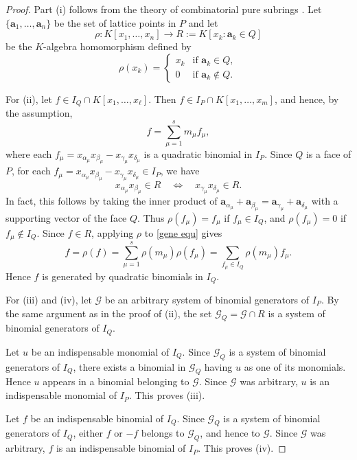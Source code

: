 \documentclass[12pt]{amsart}
\theoremstyle{definition}
\numberwithin{thm}{section}
\numberwithin{equation}{section}
\def\ab{{\mathbf a}}
\begin{document}
\begin{proof}
    Part (i) follows from the theory of combinatorial pure subrings \cite[Theorem 1.3]{cpureR1}.
Let $\{\ab_1,\dots, \ab_n\}$ be the set of lattice points in $P$
and let
\[
\rho:K[x_1,\ldots,x_n]\longrightarrow R:=K[x_k : \ab_k\in Q]
\]
be the \(K\)-algebra homomorphism defined by
\[
\rho(x_k)=
\begin{cases}
x_k & \text{if } \ab_k\in Q,\\
0 & \text{if } \ab_k\notin Q.
\end{cases}
\]


    
For (ii), let \(f\in I_Q\cap K[x_1,\ldots,x_\ell]\). 
Then
\(f\in I_P\cap K[x_1,\ldots,x_m]\), and hence, by the assumption,
\begin{equation} \label{gene equ}
    f=\sum_{\mu=1}^s m_\mu f_\mu,
\end{equation}
where each \(f_\mu=x_{\alpha_\mu} x_{\beta_\mu} - x_{\gamma_\mu} x_{\delta_\mu} \)
is a quadratic binomial in \(I_P\).
Since \(Q\) is a face of \(P\), for each  \(f_\mu=x_{\alpha_\mu} x_{\beta_\mu} - x_{\gamma_\mu} x_{\delta_\mu}\in I_P\),
we have
\[
x_{\alpha_\mu} x_{\beta_\mu}\in R \quad \Longleftrightarrow \quad   x_{\gamma_\mu} x_{\delta_\mu}\in R.
\]
In fact, this follows by taking the inner product of $\ab_{\alpha_\mu} +\ab_{\beta_\mu} =\ab_{\gamma_\mu} +\ab_{\delta_\mu}$ with a supporting vector of the face \(Q\).
Thus \(\rho(f_\mu)=f_\mu\) if \(f_\mu\in I_Q\), and  \(\rho(f_\mu)=0\)
if \(f_\mu\notin I_Q\).
Since \(f\in R\), applying \(\rho\) to  \eqref{gene equ} gives
\[
f=\rho(f)
=\sum_{\mu=1}^s \rho(m_\mu)\rho(f_\mu)
=\sum_{f_\mu \in I_Q} \rho(m_\mu) f_\mu.
\]
Hence \(f\) is generated by quadratic binomials in \(I_Q\).

For (iii) and (iv), let $\mathcal{G}$ be an arbitrary system of binomial generators of $I_P$. By the same argument as in the proof of (ii), the set $\mathcal{G}_Q = \mathcal{G} \cap R$ is a system of binomial generators of $I_Q$.

Let $u$ be an indispensable monomial of $I_Q$. Since $\mathcal{G}_Q$ is a system of binomial generators of $I_Q$, there exists a binomial in $\mathcal{G}_Q$ having $u$ as one of its monomials. Hence $u$ appears in a binomial belonging to $\mathcal{G}$. Since $\mathcal{G}$ was arbitrary, $u$ is an indispensable monomial of $I_P$. This proves (iii). 

Let $f$ be an indispensable binomial of $I_Q$. Since $\mathcal{G}_Q$ is a system of binomial generators of $I_Q$, either $f$ or $-f$ belongs to $\mathcal{G}_Q$, and hence to $\mathcal{G}$. Since $\mathcal{G}$ was arbitrary, $f$ is an indispensable binomial of $I_P$. This proves (iv).
\end{proof}
\end{document}
